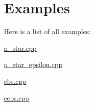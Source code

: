 \section{Examples}
Here is a list of all examples\+:\begin{DoxyCompactItemize}
\item 
\hyperlink{a_star_8cpp-example}{a\+\_\+star.\+cpp}
\item 
\hyperlink{a_star_epsilon_8cpp-example}{a\+\_\+star\+\_\+epsilon.\+cpp}
\item 
\hyperlink{cbs_8cpp-example}{cbs.\+cpp}
\item 
\hyperlink{ecbs_8cpp-example}{ecbs.\+cpp}
\end{DoxyCompactItemize}
